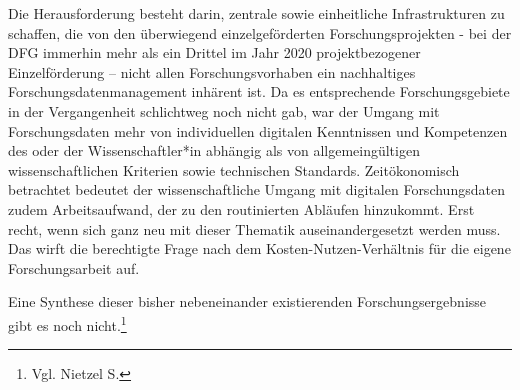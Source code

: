 Die Herausforderung besteht darin, zentrale sowie einheitliche Infrastrukturen zu schaffen, die von den überwiegend einzelgeförderten Forschungsprojekten - bei der DFG immerhin mehr als ein Drittel im Jahr 2020 projektbezogener Einzelförderung – nicht allen Forschungsvorhaben ein nachhaltiges Forschungsdatenmanagement inhärent ist. Da es entsprechende Forschungsgebiete in der Vergangenheit schlichtweg noch nicht gab, war der Umgang mit Forschungsdaten mehr von individuellen digitalen Kenntnissen und Kompetenzen des oder der Wissenschaftler*in abhängig als von allgemeingültigen wissenschaftlichen Kriterien sowie technischen Standards. Zeitökonomisch betrachtet bedeutet der wissenschaftliche Umgang mit digitalen Forschungsdaten zudem Arbeitsaufwand, der zu den routinierten Abläufen hinzukommt. Erst recht, wenn sich ganz neu mit dieser Thematik auseinandergesetzt werden muss. Das wirft die berechtigte Frage nach dem Kosten-Nutzen-Verhältnis für die eigene Forschungsarbeit auf.

Eine Synthese dieser bisher nebeneinander existierenden Forschungsergebnisse gibt es noch nicht.\footnote{Vgl. Nietzel S.}

